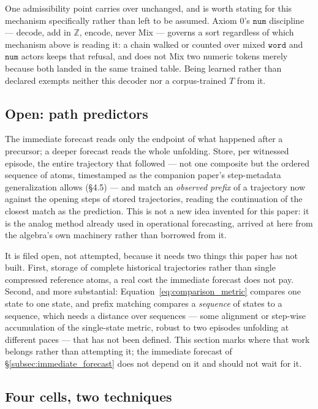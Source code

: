 \documentclass[12pt, a4paper]{article}
\begin{document}
One admissibility point carries over unchanged, and is worth stating
for this mechanism specifically rather than left to be assumed.
Axiom 0's $\mathtt{num}$ discipline --- decode, add in $\mathbb{Z}$,
encode, never Mix --- governs a sort regardless of which mechanism
above is reading it: a chain walked or counted over mixed
$\mathtt{word}$ and $\mathtt{num}$ actors keeps that refusal, and
does not Mix two numeric tokens merely because both landed in the
same trained table. Being learned rather than declared exempts
neither this decoder nor a corpus-trained $T$ from it.

\subsection{Open: path predictors}
\label{subsec:path_predictors}

The immediate forecast reads only the endpoint of what happened after
a precursor; a deeper forecast reads the whole unfolding. Store, per
witnessed episode, the entire trajectory that followed --- not one
composite but the ordered sequence of atoms, timestamped as the
companion paper's step-metadata generalization allows (\S4.5) --- and
match an
\emph{observed prefix} of a trajectory now against the opening steps of
stored trajectories, reading the continuation of the closest match as
the prediction. This is not a new idea invented for this paper: it is
the analog method already used in operational forecasting, arrived at
here from the algebra's own machinery rather than borrowed from it.

It is filed open, not attempted, because it needs two things this
paper has not built. First, storage of complete historical
trajectories rather than single compressed reference atoms, a real
cost the immediate forecast does not pay. Second, and more
substantial: Equation~\eqref{eq:comparison_metric} compares one state
to one state, and prefix matching compares a \emph{sequence} of states
to a sequence, which needs a distance over sequences --- some
alignment or step-wise accumulation of the single-state metric,
robust to two episodes unfolding at different paces --- that has not
been defined. This section marks where that work belongs rather than
attempting it; the immediate forecast of
\S\ref{subsec:immediate_forecast} does not depend on it and should not
wait for it.

\subsection{Four cells, two techniques}
\label{subsec:four_cells}
\end{document}
